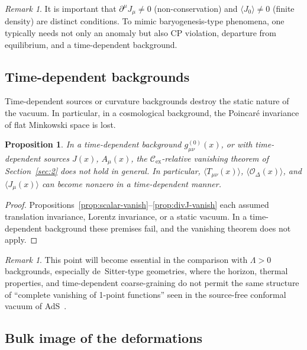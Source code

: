 \documentclass[
  aps,
  prd,
  preprint,
  groupedaddress,
  nofootinbib,
  longbibliography
]{revtex4-2}
\newtheorem{proposition}[definition]{Proposition}
\theoremstyle{remark}
\newtheorem{remark}[definition]{Remark}
\newcommand{\Cex}{\mathcal{C}_{\mathrm{ex}}}
\begin{document}
\begin{remark}\label{rem:div-vs-density}
It is important that $\partial^\mu J_\mu\neq 0$
(non-conservation) and $\langle J_0\rangle\neq 0$ (finite
density) are distinct conditions.
To mimic baryogenesis-type phenomena, one typically needs not
only an anomaly but also CP violation, departure from
equilibrium, and a time-dependent background.
\end{remark}

\subsection{Time-dependent backgrounds}\label{subsec:3-7}

Time-dependent sources or curvature backgrounds destroy the
static nature of the vacuum.
In particular, in a cosmological background, the Poincar\'e
invariance of flat Minkowski space is lost.

\begin{proposition}\label{prop:time-dep}
In a time-dependent background
$g^{(0)}_{\mu\nu}(x)$, or with time-dependent
sources $J(x)$, $A_\mu(x)$, the $\Cex$-relative vanishing
theorem of Section~\ref{sec:2} does not hold in general.
In particular,
$\langle T_{\mu\nu}(x)\rangle$,
$\langle\mathcal{O}_\Delta(x)\rangle$, and
$\langle J_\mu(x)\rangle$
can become nonzero in a time-dependent manner.
\end{proposition}

\begin{proof}
Propositions~\ref{prop:scalar-vanish}--\ref{prop:divJ-vanish}
each assumed translation invariance, Lorentz invariance, or a
static vacuum.
In a time-dependent background these premises fail, and the
vanishing theorem does not apply.
\end{proof}

\begin{remark}\label{rem:dS-preview}
This point will become essential in the comparison with
$\Lambda>0$ backgrounds, especially de~Sitter-type geometries,
where the horizon, thermal properties, and time-dependent
coarse-graining do not permit the same structure of ``complete
vanishing of 1-point functions'' seen in the source-free conformal
vacuum of AdS~\cite{ref15,ref16,ref17,ref18,ref19,ref20,ref21,ref22,ref23,ref24,ref25,ref26,ref27}.
\end{remark}

\subsection{Bulk image of the deformations}\label{subsec:3-8}
\end{document}
